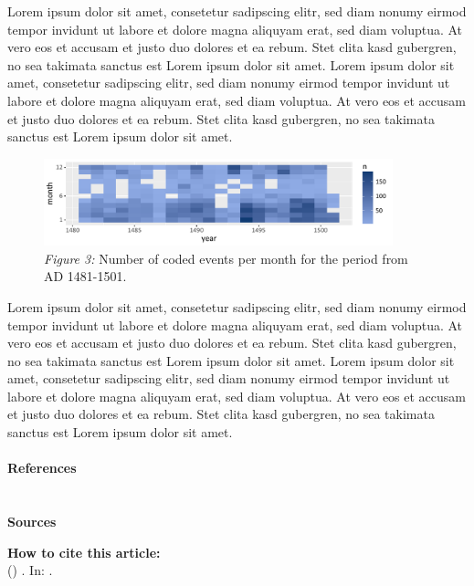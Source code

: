 Lorem ipsum dolor sit amet, consetetur sadipscing elitr, sed diam nonumy eirmod tempor invidunt ut labore et dolore magna aliquyam erat, sed diam voluptua. At vero eos et accusam et justo duo dolores et ea rebum. Stet clita kasd gubergren, no sea takimata sanctus est Lorem ipsum dolor sit amet. Lorem ipsum dolor sit amet, consetetur sadipscing elitr, sed diam nonumy eirmod tempor invidunt ut labore et dolore magna aliquyam erat, sed diam voluptua. At vero eos et accusam et justo duo dolores et ea rebum. Stet clita kasd gubergren, no sea takimata sanctus est Lorem ipsum dolor sit amet.

\begin{figure}[H]
	\begin{center}
 \includegraphics[width=0.9\textwidth]{fig/materialspecification/example_month_density.pdf}
 \caption*{\textit{Figure 3:} Number of coded events per month for the period from AD 1481-1501.}
 \end{center}
\end{figure} 
Lorem ipsum dolor sit amet, consetetur sadipscing elitr, sed diam nonumy eirmod tempor invidunt ut labore et dolore magna aliquyam erat, sed diam voluptua. At vero eos et accusam et justo duo dolores et ea rebum. Stet clita kasd gubergren, no sea takimata sanctus est Lorem ipsum dolor sit amet. Lorem ipsum dolor sit amet, consetetur sadipscing elitr, sed diam nonumy eirmod tempor invidunt ut labore et dolore magna aliquyam erat, sed diam voluptua. At vero eos et accusam et justo duo dolores et ea rebum. Stet clita kasd gubergren, no sea takimata sanctus est Lorem ipsum dolor sit amet.
\\\\
\textbf{References}
\vspace{0.25cm}\\
\\\\
\textbf{Sources}
\vspace{0.25cm}\\
\newpage

\vspace*{\fill}
\noindent
\textbf{How to cite this article:}\\
 () . In:  .\\
\href{dx.\ExecuteMetaData[variables.tex]{doiarticle}}{}